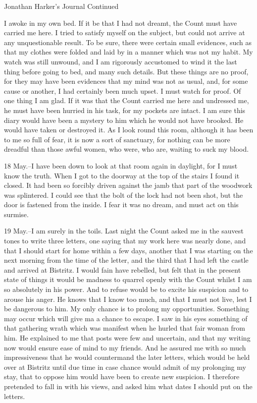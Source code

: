 Jonathan Harker's Journal Continued 

I awoke in my own bed. If it be that I had not dreamt, the Count must have carried me here. I tried to satisfy myself on the subject, but could not arrive at any unquestionable result. To be sure, there were certain small evidences, such as that my clothes were folded and laid by in a manner which was not my habit. My watch was still unwound, and I am rigorously accustomed to wind it the last thing before going to bed, and many such details. But these things are no proof, for they may have been evidences that my mind was not as usual, and, for some cause or another, I had certainly been much upset. I must watch for proof. Of one thing I am glad. If it was that the Count carried me here and undressed me, he must have been hurried in his task, for my pockets are intact. I am sure this diary would have been a mystery to him which he would not have brooked. He would have taken or destroyed it. As I look round this room, although it has been to me so full of fear, it is now a sort of sanctuary, for nothing can be more dreadful than those awful women, who were, who are, waiting to suck my blood. 

18 May.--I have been down to look at that room again in daylight, for I must know the truth. When I got to the doorway at the top of the stairs I found it closed. It had been so forcibly driven against the jamb that part of the woodwork was splintered. I could see that the bolt of the lock had not been shot, but the door is fastened from the inside. I fear it was no dream, and must act on this surmise. 

19 May.--I am surely in the toils. Last night the Count asked me in the sauvest tones to write three letters, one saying that my work here was nearly done, and that I should start for home within a few days, another that I was starting on the next morning from the time of the letter, and the third that I had left the castle and arrived at Bistritz. I would fain have rebelled, but felt that in the present state of things it would be madness to quarrel openly with the Count whilst I am so absolutely in his power. And to refuse would be to excite his suspicion and to arouse his anger. He knows that I know too much, and that I must not live, lest I be dangerous to him. My only chance is to prolong my opportunities. Something may occur which will give ma a chance to escape. I saw in his eyes something of that gathering wrath which was manifest when he hurled that fair woman from him. He explained to me that posts were few and uncertain, and that my writing now would ensure ease of mind to my friends. And he assured me with so much impressiveness that he would countermand the later letters, which would be held over at Bistritz until due time in case chance would admit of my prolonging my stay, that to oppose him would have been to create new suspicion. I therefore pretended to fall in with his views, and asked him what dates I should put on the letters. 

